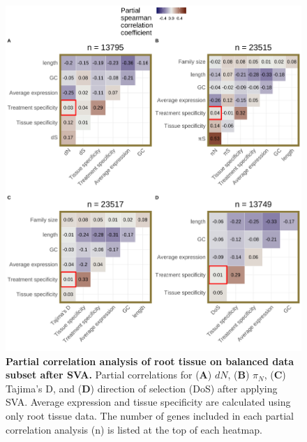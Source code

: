 \documentclass[12pt]{article}
\begin{document}
\begin{figure}[H]
\centering
\includegraphics[width = \linewidth]{figures/appendix_a/partialCorrelations_fullyBalancedSubset_root_2023-02-22.pdf}
\caption{\textbf{Partial correlation analysis of root tissue on balanced data subset after SVA.} Partial correlations for (\textbf{A}) $dN$, (\textbf{B}) $\pi_N$, (\textbf{C}) Tajima's D, and (\textbf{D}) direction of selection (DoS) after applying SVA. Average expression and tissue specificity are calculated using only root tissue data. The number of genes included in each partial correlation analysis (n) is listed at the top of each heatmap.}%
\end{figure}
\end{document}
